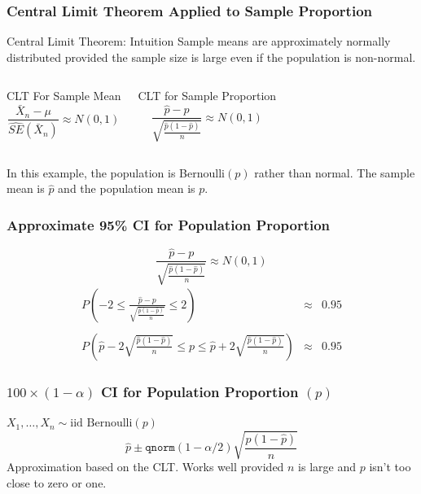 \documentclass[handout]{beamer}
\begin{document}
\begin{frame}
\frametitle{Central Limit Theorem Applied to Sample Proportion}

\begin{alertblock}{Central Limit Theorem: Intuition}
Sample means are approximately normally distributed provided the sample size is large even if the population is non-normal.
\end{alertblock}

\begin{columns}

\begin{block}{CLT For Sample Mean}
$$\frac{\bar{X}_n -\mu}{\widehat{SE}(\bar{X}_n)} \approx N(0,1)$$
\end{block}

\begin{block}{CLT for Sample Proportion}
$$\frac{\widehat{p} -p}{\sqrt{\frac{\widehat{p}(1-\widehat{p})}{n}}} \approx N(0,1)$$
\end{block}
\end{columns}

\vspace{1em}
In this example, the population is Bernoulli$(p)$ rather than normal. The sample mean is $\widehat{p}$ and the population mean is $p$.

\end{frame}
\begin{frame}
\frametitle{Approximate 95\% CI for Population Proportion}
$$\frac{\widehat{p} -p}{\sqrt{\frac{\widehat{p}(1-\widehat{p})}{n}}} \approx N(0,1)$$ 
	\begin{eqnarray*}
		P\left(-2 \leq\frac{\widehat{p} -p}{\sqrt{\frac{\widehat{p}(1-\widehat{p})}{n}}} \leq  2\right) &\approx& 0.95\\ \\ 
		P\left(\widehat{p} - 2 \sqrt{\frac{\widehat{p}(1-\widehat{p})}{n}} \leq p \leq \widehat{p} + 2\sqrt{\frac{\widehat{p}(1-\widehat{p})}{n}}\right) &\approx& 0.95
	\end{eqnarray*}
\end{frame}



\begin{frame}
\frametitle{$100\times(1-\alpha)$ CI for Population Proportion $(p)$}
$X_1, \hdots, X_n \sim \mbox{iid Bernoulli}(p)$
	$$\widehat{p} \pm \texttt{qnorm}(1-\alpha/2) \sqrt{\frac{\widehat{p}(1-\widehat{p})}{n}}$$
	\alert{Approximation based on the CLT. Works well provided $n$ is large and $p$ isn't too close to zero or one.}
\end{frame}
\end{document}
